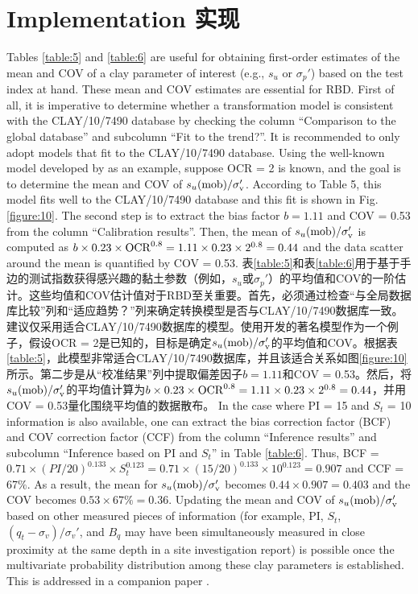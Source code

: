 \section{Implementation 实现}

\begin{Parallel}{0.60\textwidth}{}
    \ParallelLText
    {
        Tables \ref{table:5} and \ref{table:6} are useful for obtaining first-order estimates of the mean and COV of a clay parameter of interest (e.g., $s_u$ or $\sigma_p'$) based on the test index at hand. These mean and COV estimates are essential for RBD. First of all, it is imperative to determine whether a transformation model is consistent with the CLAY/10/7490 database by checking the column “Comparison to the global database” and subcolumn “Fit to the trend?”. It is recommended to only adopt models that fit to the CLAY/10/7490 database. Using the well-known model developed by \citet{Jamiolkowski198557} as an example, suppose OCR = 2 is known, and the goal is to determine the mean and COV of $s_u(\rm{mob})/\sigma_v'$. According to Table 5, this model fits well to the CLAY/10/7490 database and this fit is shown in Fig. \ref{figure:10}. The second step is to extract the bias factor $b = 1.11$ and COV = 0.53 from the column “Calibration results”. Then, the mean of $s_u(\rm{mob})/\sigma_v'$ is computed as $b\times{}0.23\times{}\rm{OCR}^{0.8}=1.11\times{}0.23\times{}2^{0.8}=0.44$ and the data scatter around the mean is quantified by COV = 0.53.
    }
    \ParallelRText
    {
        表\ref{table:5}和表\ref{table:6}用于基于手边的测试指数获得感兴趣的黏土参数（例如，$s_u$或$\sigma_p'$）的平均值和COV的一阶估计。这些均值和COV估计值对于RBD至关重要。首先，必须通过检查“与全局数据库比较”列和“适应趋势？”列来确定转换模型是否与CLAY/10/7490数据库一致。建议仅采用适合CLAY/10/7490数据库的模型。使用\citet{Jamiolkowski198557}开发的著名模型作为一个例子，假设OCR = 2是已知的，目标是确定$s_u(\rm{mob})/\sigma_v'$的平均值和COV。根据表\ref{table:5}，此模型非常适合CLAY/10/7490数据库，并且该适合关系如图\ref{figure:10}所示。第二步是从“校准结果”列中提取偏差因子$b = 1.11$和COV = 0.53。然后，将$s_u(\rm{mob})/\sigma_v'$的平均值计算为$b\times{}0.23\times{}\rm{OCR}^{0.8}=1.11\times{}0.23\times{}2^{0.8}=0.44$，并用COV = 0.53量化围绕平均值的数据散布。
    }
    \ParallelPar
    \ParallelLText
    {
        In the case where PI = 15 and $S_t$ = 10 information is also available, one can extract the bias correction factor (BCF) and COV correction factor (CCF) from the column “Inference results” and subcolumn “Inference based on PI and $S_t$” in Table \ref{table:6}. Thus, BCF = $0.71\times{}(PI/20)^{0.133}\times{}S_t^{0.123} = 0.71\times{}(15/20)^{0.133}\times{}10^{0.123} = 0.907$ and CCF = 67$\%$. As a result, the mean for $s_u(\rm{mob})/\sigma_v'$ becomes $0.44\times{}0.907 = 0.403$ and the COV becomes $0.53\times{}67\%= 0.36$. Updating the mean and COV of $s_u(\rm{mob})/\sigma_v'$ based on other measured pieces of information (for example, PI, $S_t$, $(q_t-\sigma_v)/\sigma_v'$, and $B_q$ may have been simultaneously measured in close proximity at the same depth in a site investigation report) is possible once the multivariate probability distribution among these clay parameters is established. This is addressed in a companion paper \citep{Ching2014686}.
}
\end{Parallel}
